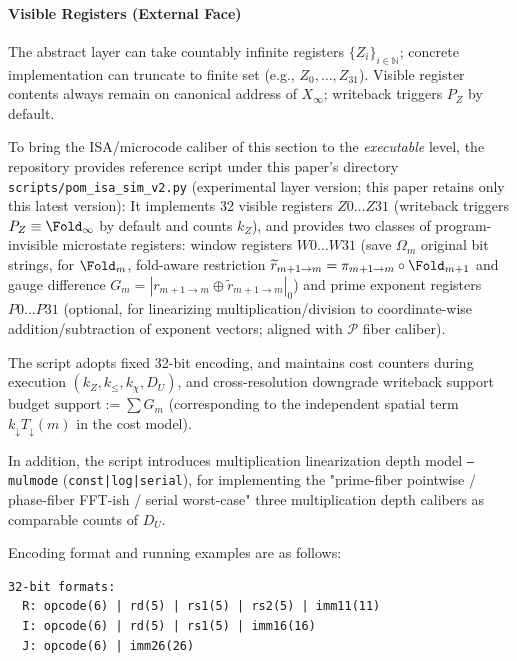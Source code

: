 \paragraph{Visible Registers (External Face)}
The abstract layer can take countably infinite registers $\{Z_i\}_{i\in\mathbb N}$; concrete implementation can truncate to finite set (e.g., $Z_0,\dots,Z_{31}$). Visible register contents always remain on canonical address of $X_\infty$; writeback triggers $P_Z$ by default.

\begin{remark}\label{rem:pom-isa-sim}
To bring the ISA/microcode caliber of this section to the \emph{executable} level, the repository provides reference script under this paper's directory
\texttt{scripts/pom\_isa\_sim\_v2.py} (experimental layer version; this paper retains only this latest version):
It implements 32 visible registers $Z0\ldots Z31$ (writeback triggers $P_Z\equiv\Fold_\infty$ by default and counts $k_Z$), and provides two classes of program-invisible microstate registers:
window registers $W0\ldots W31$ (save $\Omega_m$ original bit strings, for $\Fold_m$, fold-aware restriction
\(\widetilde r_{m+1\to m}=\pi_{m+1\to m}\circ \Fold_{m+1}\)
and gauge difference \(G_m=|r_{m+1\to m}\oplus \widetilde r_{m+1\to m}|_0\))
and prime exponent registers $P0\ldots P31$ (optional, for linearizing multiplication/division to coordinate-wise addition/subtraction of exponent vectors; aligned with \(\mathcal P\) fiber caliber).
\par
The script adopts fixed 32-bit encoding, and maintains cost counters during execution
\((k_Z,k_{\le},k_\chi,D_U)\),
and cross-resolution downgrade writeback support budget
\(\mathrm{support}:=\sum G_m\)
(corresponding to the independent spatial term \(k_{\downarrow}T_{\downarrow}(m)\) in the cost model).
\par
In addition, the script introduces multiplication linearization depth model \texttt{--mulmode} (\texttt{const|log|serial}), for implementing the "prime-fiber pointwise / phase-fiber FFT-ish / serial worst-case" three multiplication depth calibers as comparable counts of \(D_U\).
\par
Encoding format and running examples are as follows:
\begin{verbatim}
32-bit formats:
  R: opcode(6) | rd(5) | rs1(5) | rs2(5) | imm11(11)
  I: opcode(6) | rd(5) | rs1(5) | imm16(16)
  J: opcode(6) | imm26(26)


\end{verbatim}
\end{remark}
